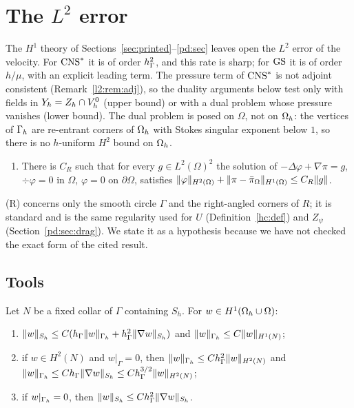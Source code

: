 \section{The \texorpdfstring{$L^2$}{L2} error}\label{l2:sec}

The $H^1$ theory of Sections~\ref{sec:printed}--\ref{pd:sec} leaves open the $L^2$ error of the velocity. For $\mathrm{CNS}^\ast$ it is of order $h_\Gamma^2$, and this rate is sharp; for $\mathrm{GS}$ it is of order $h/\mu$, with an explicit leading term. The pressure term of $\mathrm{CNS}^\ast$ is not adjoint consistent (Remark~\ref{l2:rem:adj}), so the duality arguments below test only with fields in $Y_h=Z_h\cap V_h^0$ (upper bound) or with a dual problem whose pressure vanishes (lower bound). The dual problem is posed on $\Omega$, not on $\Omega_h$: the vertices of $\Gamma_h$ are re-entrant corners of $\Omega_h$ with Stokes singular exponent below $1$, so there is no $h$-uniform $H^2$ bound on $\Omega_h$.

\begin{enumerate}
\item[(R)] There is $C_R$ such that for every $g\in L^2(\Omega)^2$ the solution of $-\Delta\varphi+\nabla\pi=g$, $\div\varphi=0$ in $\Omega$, $\varphi=0$ on $\partial\Omega$, satisfies $\lVert \varphi\rVert_{H^2(\Omega)}+\lVert \pi-\bar\pi_\Omega\rVert_{H^1(\Omega)}\le C_R\lVert g\rVert$.
\end{enumerate}
(R) concerns only the smooth circle $\Gamma$ and the right-angled corners of $R$; it is standard \cite{Dauge1989} and is the same regularity used for $U$ (Definition~\ref{hc:def}) and $Z_\psi$ (Section~\ref{pd:sec:drag}). We state it as a hypothesis because we have not checked the exact form of the cited result.

\subsection{Tools}

\begin{lemma}[Strip]\label{l2:strip}
Let $N$ be a fixed collar of $\Gamma$ containing $S_h$. For $w\in H^1(\Omega_h\cup\Omega)$:
\begin{enumerate}[label=(\alph*)]
\item $\lVert w\rVert_{S_h}\le C(h_\Gamma\lVert w\rVert_{\Gamma_h}+h_\Gamma^2\lVert \nabla w\rVert_{S_h})$ and $\lVert w\rVert_{\Gamma_h}\le C\lVert w\rVert_{H^1(N)}$;
\item if $w\in H^2(N)$ and $w|_\Gamma=0$, then $\lVert w\rVert_{\Gamma_h}\le Ch_\Gamma^2\lVert w\rVert_{H^2(N)}$ and $\lVert w\rVert_{\Gamma_h}\le Ch_\Gamma\lVert \nabla w\rVert_{S_h}\le Ch_\Gamma^{3/2}\lVert w\rVert_{H^2(N)}$;
\item if $w|_{\Gamma_h}=0$, then $\lVert w\rVert_{S_h}\le Ch_\Gamma^2\lVert \nabla w\rVert_{S_h}$.
\end{enumerate}
\end{lemma}

